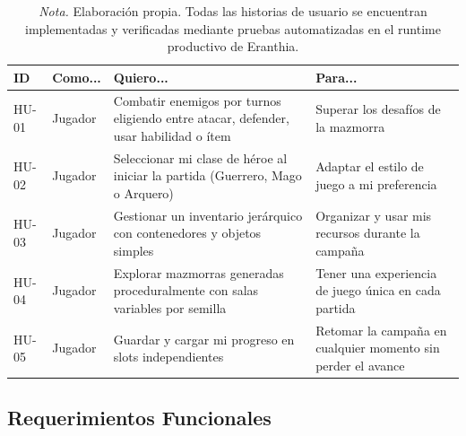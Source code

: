 \documentclass[stu,12pt,floatsintext]{apa7}
\begin{document}
\begin{table}[H]
\centering
\caption{Historias de usuario del sistema Eranthia}
\begin{tabular}{p{1.5cm}p{2cm}p{5cm}p{5cm}}
\toprule
\textbf{ID} & \textbf{Como...} & \textbf{Quiero...} & \textbf{Para...} \\
\midrule
HU-01 & Jugador & Combatir enemigos por turnos eligiendo entre atacar, defender, usar habilidad o ítem & Superar los desafíos de la mazmorra \\

HU-02 & Jugador & Seleccionar mi clase de héroe al iniciar la partida (Guerrero, Mago o Arquero) & Adaptar el estilo de juego a mi preferencia \\

HU-03 & Jugador & Gestionar un inventario jerárquico con contenedores y objetos simples & Organizar y usar mis recursos durante la campaña \\

HU-04 & Jugador & Explorar mazmorras generadas proceduralmente con salas variables por semilla & Tener una experiencia de juego única en cada partida \\

HU-05 & Jugador & Guardar y cargar mi progreso en slots independientes & Retomar la campaña en cualquier momento sin perder el avance \\
\bottomrule
\end{tabular}
\caption*{\textit{Nota.} Elaboración propia. Todas las historias de usuario se encuentran implementadas y verificadas mediante pruebas automatizadas en el runtime productivo de Eranthia.}
\end{table}


\subsection{Requerimientos Funcionales}
\end{document}

